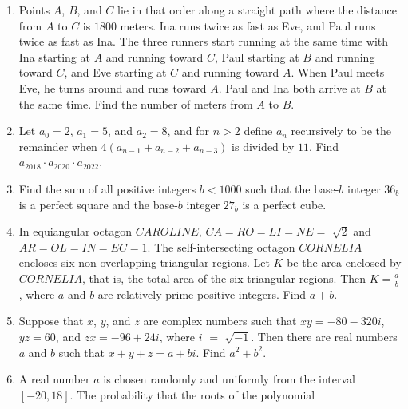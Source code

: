 \documentclass{article}
\begin{document}
\begin{enumerate}[label=\arabic*., itemsep=0.5em]\item Points \(A\), \(B\), and \(C\) lie in that order along a straight path where the distance from \(A\) to \(C\) is \(1800\) meters. Ina runs twice as fast as Eve, and Paul runs twice as fast as Ina. The three runners start running at the same time with Ina starting at \(A\) and running toward \(C\), Paul starting at \(B\) and running toward \(C\), and Eve starting at \(C\) and running toward \(A\). When Paul meets Eve, he turns around and runs toward \(A\). Paul and Ina both arrive at \(B\) at the same time. Find the number of meters from \(A\) to \(B\).\par \vspace{0.5em}\item Let \(a_{0} = 2\), \(a_{1} = 5\), and \(a_{2} = 8\), and for \(n > 2\) define \(a_{n}\) recursively to be the remainder when \(4(a_{n-1} + a_{n-2} + a_{n-3})\) is divided by \(11\). Find \(a_{2018} \cdot a_{2020} \cdot a_{2022}\).\par \vspace{0.5em}\item Find the sum of all positive integers \(b < 1000\) such that the base-\(b\) integer \(36_{b}\) is a perfect square and the base-\(b\) integer \(27_{b}\) is a perfect cube.\par \vspace{0.5em}\item In equiangular octagon \(CAROLINE\), \(CA = RO = LI = NE =\) \(\sqrt{2}\) and \(AR = OL = IN = EC = 1\). The self-intersecting octagon \(CORNELIA\) encloses six non-overlapping triangular regions. Let \(K\) be the area enclosed by \(CORNELIA\), that is, the total area of the six triangular regions. Then \(K = \frac{a}{b}\), where \(a\) and \(b\) are relatively prime positive integers. Find \(a + b\).\par \vspace{0.5em}\item Suppose that \(x\), \(y\), and \(z\) are complex numbers such that \(xy = -80 - 320i\), \(yz = 60\), and \(zx = -96 + 24i\), where \(i\) \(=\) \(\sqrt{-1}\). Then there are real numbers \(a\) and \(b\) such that \(x + y + z = a + bi\). Find \(a^2 + b^2\).\par \vspace{0.5em}\item A real number \(a\) is chosen randomly and uniformly from the interval \([-20, 18]\). The probability that the roots of the polynomial



\end{enumerate}
\end{document}
